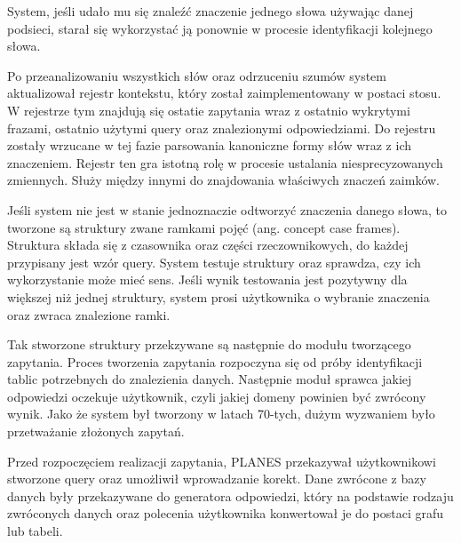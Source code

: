 System, jeśli udało mu się znaleźć znaczenie jednego słowa używając danej podsieci, starał się wykorzystać ją ponownie w procesie identyfikacji kolejnego słowa.

Po przeanalizowaniu wszystkich słów oraz odrzuceniu szumów system aktualizował rejestr kontekstu, który został zaimplementowany w postaci stosu. W rejestrze tym znajdują się ostatie zapytania wraz z ostatnio wykrytymi frazami, ostatnio użytymi query oraz znalezionymi odpowiedziami. Do rejestru zostały wrzucane w tej fazie parsowania kanoniczne formy słów wraz z ich znaczeniem. Rejestr ten gra istotną rolę w procesie ustalania niesprecyzowanych zmiennych. Służy między innymi do znajdowania właściwych znaczeń zaimków.

Jeśli system nie jest w stanie jednoznaczie odtworzyć znaczenia danego słowa, to tworzone są struktury zwane ramkami pojęć (ang. concept case frames). Struktura składa się z czasownika oraz części rzeczownikowych, do każdej przypisany jest wzór query. System testuje struktury oraz sprawdza, czy ich wykorzystanie może mieć sens. Jeśli wynik testowania jest pozytywny dla większej niż jednej struktury, system prosi użytkownika o wybranie znaczenia oraz zwraca znalezione ramki.

Tak stworzone struktury przekzywane są następnie do modułu tworzącego zapytania. Proces tworzenia zapytania rozpoczyna się od próby identyfikacji tablic potrzebnych do znalezienia danych. Następnie moduł sprawca jakiej odpowiedzi oczekuje użytkownik, czyli jakiej domeny powinien być zwrócony wynik. Jako że system był tworzony w latach 70-tych, dużym wyzwaniem było przetważanie złożonych zapytań.

Przed rozpoczęciem realizacji zapytania, PLANES przekazywał użytkownikowi stworzone query oraz umożliwił wprowadzanie korekt. Dane zwrócone z bazy danych były przekazywane do generatora odpowiedzi, który na podstawie rodzaju zwróconych danych oraz polecenia użytkownika konwertował je do postaci grafu lub tabeli\cite{waltz1978english}.


